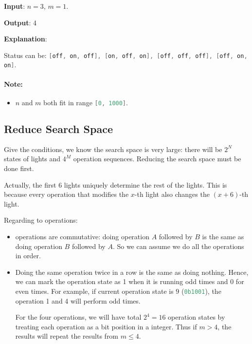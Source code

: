 \begin{flushleft}


\textbf{Input}: $n = 3$, $m = 1$.

\textbf{Output}: 4

\textbf{Explanation}: 

Status can be: \lstinline[language=Java, basicstyle=\small\ttfamily, keywordstyle=\bfseries\color{green!40!black}]|[off, on, off], [on, off, on], [off, off, off], [off, on, on]|.
\end{flushleft}

\paragraph{Note:} 
\begin{itemize}
\item $n$ and $m$ both fit in range \lstinline[language=Java, basicstyle=\small\ttfamily, keywordstyle=\bfseries\color{green!40!black}]|[0, 1000]|.
\end{itemize}

\subsection{Reduce Search Space}
Give the conditions, we know the search space is very large: there will be $2^N$ states of lights and $4^M$ operation sequences. Reducing the search space must be done first.

Actually, the first 6 lights uniquely determine the rest of the lights. This is because every operation that modifies the $x$-th light also changes the $(x+6)$-th light.

Regarding to operations: 

\begin{itemize}
\item operations are commutative: doing operation $A$ followed by $B$ is the same as doing operation $B$ followed by $A$. So we can assume we do all the operations in order. 
\item Doing the same operation twice in a row is the same as doing nothing. Hence, we can mark the operation state as 1 when it is running odd times and 0 for even times. For example, if current operation state is $9$ (\lstinline[language=C++, basicstyle=\small\ttfamily, keywordstyle=\bfseries\color{green!40!black}]|0b1001|), the operation 1 and 4 will perform odd times.

For the four operations, we will have total $2^4=16$ operation states by treating each operation as a bit position in a integer. Thus if $m > 4$, the results will repeat the results from $m \leq 4$. 
\end{itemize}

